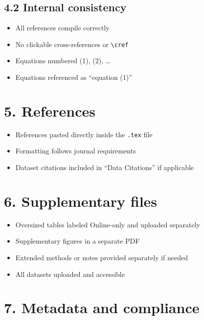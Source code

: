 \documentclass[11pt]{article}
\begin{document}
\begin{Form}
\subsection*{4.2 Internal consistency}

\begin{itemize}[leftmargin=1.5cm]
    \item \CheckBox{} All references compile correctly
    \item \CheckBox{} No clickable cross-references or \texttt{\textbackslash cref}
    \item \CheckBox{} Equations numbered (1), (2), \dots
    \item \CheckBox{} Equations referenced as ``equation (1)''
\end{itemize}

\section*{5. References}

\begin{itemize}[leftmargin=1.5cm]
    \item \CheckBox{} References pasted directly inside the \texttt{.tex} file
    \item \CheckBox{} Formatting follows journal requirements
    \item \CheckBox{} Dataset citations included in ``Data Citations'' if applicable
\end{itemize}

\section*{6. Supplementary files}

\begin{itemize}[leftmargin=1.5cm]
    \item \CheckBox{} Oversized tables labeled Online-only and uploaded separately
    \item \CheckBox{} Supplementary figures in a separate PDF
    \item \CheckBox{} Extended methods or notes provided separately if needed
    \item \CheckBox{} All datasets uploaded and accessible
\end{itemize}

\section*{7. Metadata and compliance}


\end{Form}
\end{document}
